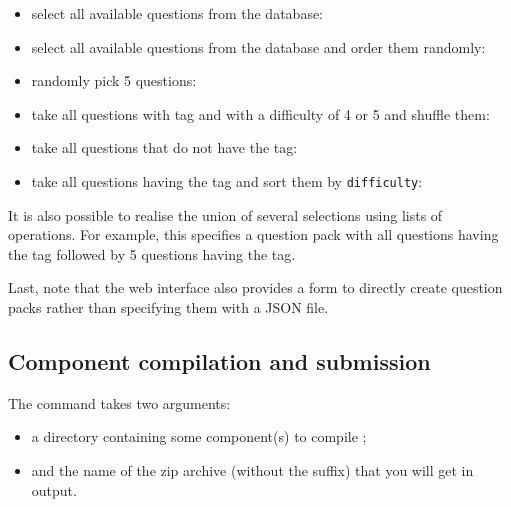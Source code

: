 \begin{itemize}
\item select all available questions from the database:
  

\item select all available questions from the database and order them
  randomly:
  

\item randomly pick 5 questions:
  

\item take all questions with tag  and with a difficulty
  of 4 or 5 and shuffle them:
  

\item take all questions that do not have the  tag:
  

\item take all questions having the  tag and sort them
  by \verb+difficulty+:
  
\end{itemize}

It is also possible to realise the union of several selections using
lists of operations. For example, this specifies a question pack with
all questions having the  tag followed by 5 questions
having the  tag.


Last, note that the web interface also provides a form to directly
create question packs rather than specifying them with a JSON file.
\subsection{Component compilation and submission}
The  command takes two arguments:
\begin{itemize}
\item a directory containing some component(s) to compile ;
\item and the name of the zip archive (without the  suffix)
  that you will get in output.
\end{itemize}

